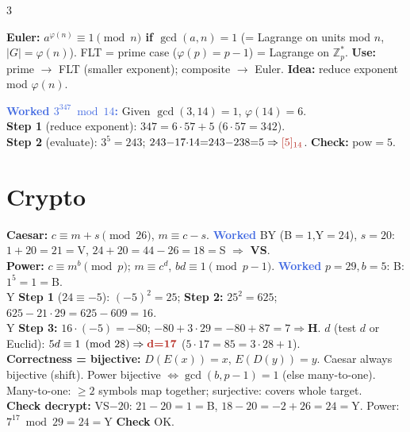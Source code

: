 \documentclass[9pt]{extarticle}
\newcommand{\hl}[1]{\textbf{\textcolor{BrickRed}{#1}}}
\newcommand{\wk}[1]{\textbf{\textcolor{OliveGreen}{#1}}}
\newcommand{\ex}[1]{\textbf{\textcolor{RoyalBlue}{#1}}}
\begin{document}
\begin{multicols}{3}
\begin{kbox}\raggedright
\textbf{Euler:} \hl{$a^{\varphi(n)}\equiv1\pmod n$ if $\gcd(a,n){=}1$} (= Lagrange on units mod $n$, $|G|{=}\varphi(n)$). FLT = prime case ($\varphi(p){=}p{-}1$) = Lagrange on $\mathbb Z_p^*$. \hl{Use:} prime $\to$ FLT (smaller exponent); composite $\to$ Euler. \hl{Idea:} reduce exponent mod $\varphi(n)$.
\end{kbox}
\begin{sloppypar}\raggedright
\ex{Worked $3^{347}\bmod14$:} Given $\gcd(3,14){=}1$, $\varphi(14){=}6$.\\
\wk{Step 1} (reduce exponent): $347{=}6{\cdot}57{+}5$ ($6{\cdot}57{=}342$).\\
\wk{Step 2} (evaluate): $3^5{=}243$; $243{-}17{\cdot}14{=}243{-}238{=}5\Rightarrow\hl{$[5]_{14}$}$. \wk{Check:} $\mathrm{pow}{=}5$.
\end{sloppypar}

\section{Crypto}
\begin{sloppypar}\raggedright
\textbf{Caesar:} $c\equiv m{+}s\pmod{26}$, $m\equiv c{-}s$. \ex{Worked} BY (B${=}1$,Y${=}24$), $s{=}20$: $1{+}20{=}21{=}$V, $24{+}20{=}44{-}26{=}18{=}$S $\Rightarrow$ \hl{VS}.\\
\textbf{Power:} $c\equiv m^b\pmod p$; $m\equiv c^d$, $bd\equiv1\pmod{p-1}$. \ex{Worked} $p{=}29,b{=}5$: B: $1^5{=}1{=}$B.\\
Y \wk{Step 1} ($24\equiv{-}5$): $({-}5)^2{=}25$; \wk{Step 2:} $25^2{=}625$; $625{-}21{\cdot}29{=}625{-}609{=}16$.\\
Y \wk{Step 3:} $16{\cdot}({-}5){=}{-}80$; ${-}80{+}3{\cdot}29{=}{-}80{+}87{=}7\Rightarrow$\hl{H}. $d$ (test $d$ or Euclid): $5d\equiv1\pmod{28}\Rightarrow \hl{d{=}17}$ ($5{\cdot}17{=}85{=}3{\cdot}28{+}1$).\\
\hl{Correctness = bijective:} $D(E(x)){=}x$, $E(D(y)){=}y$. Caesar always bijective (shift). Power bijective $\iff\gcd(b,p{-}1){=}1$ (else many-to-one). Many-to-one: $\ge2$ symbols map together; surjective: covers whole target.\\
\wk{Check decrypt:} VS${-}20$: $21{-}20{=}1{=}$B, $18{-}20{=}{-}2{+}26{=}24{=}$Y. Power: $7^{17}\bmod29{=}24{=}$Y \wk{Check} OK.
\end{sloppypar}


\end{multicols}
\end{document}
